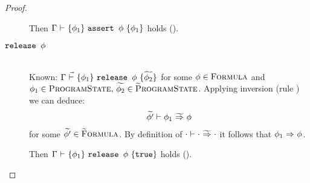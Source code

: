 \begin{proof}
\begin{description}
        Then $\thoare{\Gamma}{\phi_1}{\sAssert {$\phi$}}{\phi_1}$ holds ().
        
        
        \item[$\sRelease {$\phi$}$]~\\
        Known: $\dgthoare{\Gamma}{\phi_1}{\sRelease {$\phi$}}{\grad{\phi_2}}$ for some $\phi \in \setFormula$ and $\phi_1 \in \setProgramState,\, \grad{\phi_2} \in \setGProgramState$.
        Applying inversion (rule ) we can deduce:
        \begin{gather*}
       \gphiImpliesEv{\phi_1}{\phi}{\grad{\phi'}}
        \end{gather*}
        for some $\grad{\phi'} \in \setGFormula$.
        By definition of $\gphiImpliesEv{\cdot}{\cdot}{\cdot}$ it follows that $\phiImplies{\phi_1}{\phi}$.
        
        Then $\thoare{\Gamma}{\phi_1}{\sRelease {$\phi$}}{\phiTrue}$ holds ().
    \end{description}
\end{proof}

